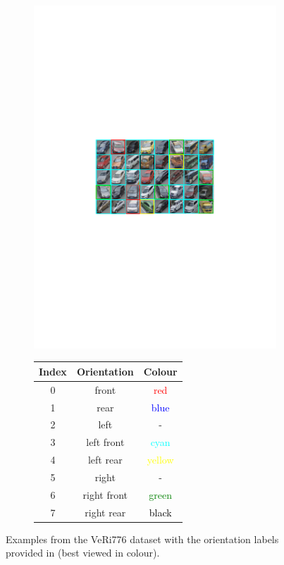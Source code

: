 \documentclass[10pt,twocolumn,letterpaper]{article}
\begin{document}
\begin{figure}
  \begin{subfigure}{.6\textwidth}
    \includegraphics[width=\linewidth,trim=5cm 11cm 5cm 11cm,clip=true]{images/veri_orients.pdf}
  \end{subfigure}
  \begin{subfigure}{.4\textwidth}
    \centering
    \begin{tabular}{c | c | c}
      \hline
      Index & Orientation & Colour \\
      \hline
      0 & front & \textcolor{red}{red} \\
      1 & rear & \textcolor{blue}{blue}  \\
      2 & left  & - \\
      3 & left front & \textcolor{cyan}{cyan}  \\
      4 & left rear & \textcolor{yellow}{yellow}  \\
      5 & right  & - \\
      6 & right front & \textcolor{green}{green} \\
      7 & right rear & \textcolor{black}{black} \\
      \hline
    \end{tabular}
  \end{subfigure}
  \caption{Examples from the VeRi776 dataset with the orientation labels provided in \cite{wang2017orientation} (best viewed in colour).}
  \label{T:veri_veh_orientations}
\end{figure}
\end{document}
